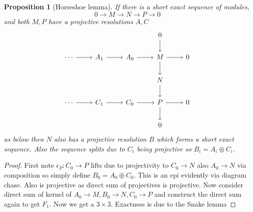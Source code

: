\documentclass[12pt]{article}
\numberwithin{equation}{section}
\newcounter{dummy} \numberwithin{dummy}{section}
\newtheorem{proposition}[dummy]{Proposition}
\begin{document}
	\begin{proposition}[Horseshoe lemma]
		If there is a short exact sequence of modules,
		\[ 0 \to M \to N \to P \to 0 \]
		and both $M,P$ have a projective resolutions $A, C$ 
		\[\begin{tikzcd}
			&&& 0 \\
			\cdots & {A_1} & {A_0} & M & 0 \\
			&&& N \\
			\cdots & {C_1} & {C_0} & P & 0 \\
			&&& 0
			\arrow[from=2-4, to=2-5]
			\arrow[from=1-4, to=2-4]
			\arrow[from=2-4, to=3-4]
			\arrow[from=3-4, to=4-4]
			\arrow[from=4-4, to=4-5]
			\arrow[from=4-4, to=5-4]
			\arrow[ from=4-3, to=4-4]
			\arrow[ from=2-3, to=2-4]
			\arrow[from=2-1, to=2-2]
			\arrow[from=2-2, to=2-3]
			\arrow[from=4-1, to=4-2]
			\arrow[from=4-2, to=4-3]
		\end{tikzcd}\]
		as below then $N$ also has a projective resolution $B$ which forms a short exact sequence. Also the sequence splits due to $C_i$ being projective so $B_i=A_i \oplus C_i$.
	\end{proposition}
	\begin{proof}
		First note $\epsilon_P: C_0 \to P$ lifts due to projectivity to $C_0 \to N$ also $A_0\to N$ via composition so simply define $B_0 = A_0 \oplus C_0$. This is an epi evidently via diagram chase. Also is projective as direct sum of projectives is projective. Now consider direct sum of kernel of $A_0 \to M, B_0 \to N, C_0 \to P$ and construct the direct sum again to get $F_1$.	Now we get a $3\times 3$. Exactness is due to the Snake lemma
	\end{proof}

	
	
\end{document}

